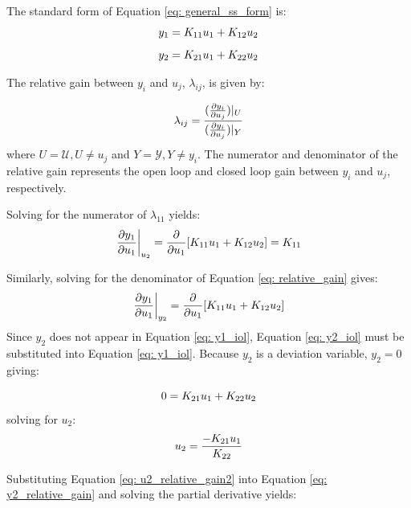 \noindent
The standard form of Equation \ref{eq: general_ss_form} is:
{
\begin{equation}
    \centering
    y_1 = K_{11}u_1 + K_{12}u_2
    \label{eq: y1_iol}
\end{equation}
\begin{equation}
    \centering
    y_2 = K_{21}u_1 + K_{22}u_2
    \label{eq: y2_iol}
\end{equation}}

\noindent
The relative gain between $y_i$ and $u_j$, $\lambda_{ij}$, is given by:

\begin{equation}
    \centering
    {\Large
    \lambda_{ij} = \frac{(\frac{\partial y_i}{\partial u_j})|_{U}}{(\frac{\partial y_i}{\partial u_j})|_{Y}}
    }
    \label{eq: relative_gain}
\end{equation}
where $U = \mathcal{U}, U \neq u_j$ and $Y = \mathcal{Y},Y \neq y_i$.  The numerator and denominator of the relative gain represents the open loop and closed loop gain between $y_i$ and $u_j$, respectively.

\noindent
Solving for the numerator of $\lambda_{11}$ yields:
\begin{equation}
    \centering
    \left.\frac{\partial y_1}{\partial u_1} \right \vert_{u_2} = \frac{\partial}{\partial u_1}[K_{11}u_1 + K_{12}u_2] = K_{11}
\end{equation}

\noindent
Similarly, solving for the denominator of Equation \ref{eq: relative_gain} gives:
\begin{equation}
    \centering
    \left.\frac{\partial y_1}{\partial u_1}\right\vert_{y_2} = \frac{\partial}{\partial u_1}[K_{11}u_1 + K_{12}u_2]
    \label{eq: y2_relative_gain}
\end{equation}
Since $y_2$ does not appear in Equation \ref{eq: y1_iol}, Equation \ref{eq: y2_iol} must be substituted into Equation \ref{eq: y1_iol}.  Because $y_2$ is a deviation variable, $y_2 = 0$ giving:

\begin{equation}
    \centering
    0 = K_{21}u_1 + K_{22}u_2
    \label{eq: u2_relative_gain1}
\end{equation}
solving for $u_2$:
\begin{equation}
    \centering
    u_2 = \frac{-K_{21}u_1}{K_{22}}
    \label{eq: u2_relative_gain2}
\end{equation}

\noindent
Substituting Equation \ref{eq: u2_relative_gain2} into Equation \ref{eq: y2_relative_gain} and solving the partial derivative yields:


